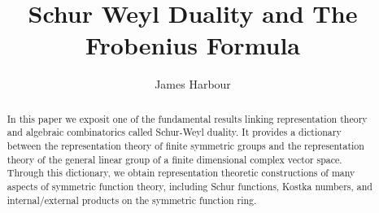 \documentclass[12pt]{article}
\title{Schur Weyl Duality and The Frobenius Formula}
\author{James Harbour}
\begin{document}
\maketitle

\begin{abstract}
  In this paper we exposit one of the fundamental results linking representation theory and algebraic combinatorics called Schur-Weyl duality. It provides a dictionary between the representation theory of finite symmetric groups and the representation theory of the general linear group of a finite dimensional complex vector space. Through this dictionary, we obtain representation theoretic constructions of many aspects of symmetric function theory, including Schur functions, Kostka numbers, and internal/external products on the symmetric function ring.
\end{abstract}

\tableofcontents











\printbibliography
\end{document}
